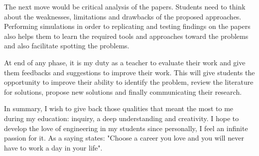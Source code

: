     The next move would be critical analysis of the papers. Students need to think about the weaknesses, limitations and drawbacks of the proposed approaches. Performing simulations in order to   replicating and testing findings on the papers also helps them to 
    learn the required tools and approaches toward the problems and also facilitate spotting the problems.
    
    At end of any phase, it is my duty as a teacher to evaluate their work and give them feedbacks and suggestions to improve their work. This will give students the opportunity to improve their ability to identify the problem, review the literature  for solutions, propose new solutions and finally communicating their research. 
    
    
    In summary, I wish to give back those qualities that meant the most to me during my
education: inquiry, a deep understanding and creativity. I hope to develop the love of engineering in my students since personally, I feel an infinite passion for it. As a saying states: "Choose a career you love and you will never have to work a day in your life".
